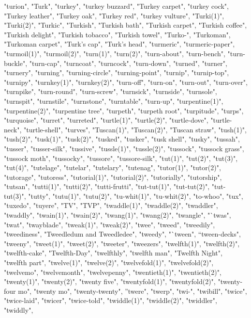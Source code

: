 "turion",
"Turk",
"turkey",
"turkey buzzard",
"Turkey carpet",
"turkey cock",
"Turkey leather",
"Turkey oak",
"Turkey red",
"turkey vulture",
"Turki(1)",
"Turki(2)",
"Turkic",
"Turkish",
"Turkish bath",
"Turkish carpet",
"Turkish coffee",
"Turkish delight",
"Turkish tobacco",
"Turkish towel",
"Turko-",
"Turkoman",
"Turkoman carpet",
"Turk's cap",
"Turk's head",
"turmeric",
"turmeric-paper",
"turmoil(1)",
"turmoil(2)",
"turn(1)",
"turn(2)",
"turn-about",
"turn-bench",
"turn-buckle",
"turn-cap",
"turncoat",
"turncock",
"turn-down",
"turned",
"turner",
"turnery",
"turning",
"turning-circle",
"turning-point",
"turnip",
"turnip-top",
"turnipy",
"turnkey(1)",
"turnkey(2)",
"turn-off",
"turn-on",
"turn-out",
"turn-over",
"turnpike",
"turn-round",
"turn-screw",
"turnsick",
"turnside",
"turnsole",
"turnspit",
"turnstile",
"turnstone",
"turntable",
"turn-up",
"turpentine(1)",
"turpentine(2)",
"turpentine tree",
"turpeth",
"turpeth root",
"turpitude",
"turps",
"turquoise",
"turret",
"turreted",
"turtle(1)",
"turtle(2)",
"turtle-dove",
"turtle-neck",
"turtle-shell",
"turves",
"Tuscan(1)",
"Tuscan(2)",
"Tuscan straw",
"tush(1)",
"tush(2)",
"tusk(1)",
"tusk(2)",
"tusked",
"tusker",
"tusk shell",
"tusky",
"tussah",
"tusser",
"tusser-silk",
"tussive",
"tussle(1)",
"tussle(2)",
"tussock",
"tussock grass",
"tussock moth",
"tussocky",
"tussore",
"tussore-silk",
"tut(1)",
"tut(2)",
"tut(3)",
"tut(4)",
"tutelage",
"tutelar",
"tutelary",
"tutenag",
"tutor(1)",
"tutor(2)",
"tutorage",
"tutoress",
"tutorial(1)",
"tutorial(2)",
"tutorially",
"tutorship",
"tutsan",
"tutti(1)",
"tutti(2)",
"tutti-frutti",
"tut-tut(1)",
"tut-tut(2)",
"tut-tut(3)",
"tutty",
"tutu(1)",
"tutu(2)",
"tu-whit(1)",
"tu-whit(2)",
"to-whoo",
"tux",
"tuxedo",
"tuyere",
"TV",
"TVP",
"twaddle(1)",
"twaddle(2)",
"twaddler",
"twaddly",
"twain(1)",
"twain(2)",
"twang(1)",
"twang(2)",
"twangle",
"`twas",
"twat",
"twayblade",
"tweak(1)",
"tweak(2)",
"twee",
"tweed",
"tweedily",
"tweediness",
"Tweedledum and Tweedledee",
"tweedy",
"`tween",
"`tween-decks",
"tweeny",
"tweet(1)",
"tweet(2)",
"tweeter",
"tweezers",
"twelfth(1)",
"twelfth(2)",
"twelfth-cake",
"Twelfth-Day",
"twelfthly",
"twelfth man",
"Twelfth Night",
"twelfth part",
"twelve(1)",
"twelve(2)",
"twelvefold(1)",
"twelvefold(2)",
"twelvemo",
"twelvemonth",
"twelvepenny",
"twentieth(1)",
"twentieth(2)",
"twenty(1)",
"twenty(2)",
"twenty five",
"twentyfold(1)",
"twentyfold(2)",
"twenty-four mo",
"twenty mo",
"twenty-twenty",
"'twere",
"twerp",
"twi-",
"twibill",
"twice",
"twice-laid",
"twicer",
"twice-told",
"twiddle(1)",
"twiddle(2)",
"twiddler",
"twiddly",
